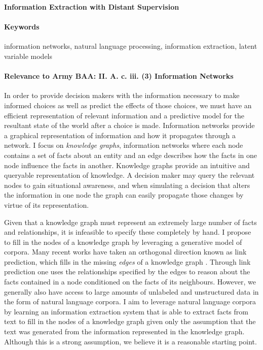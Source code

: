 \documentclass[12pt]{article}
\begin{document}

\begin{center}
\textbf{Information Extraction with Distant Supervision}
\end{center}

\paragraph{Keywords}
information networks, natural language processing, information extraction, latent variable models

\paragraph{Relevance to Army BAA: II. A. c. iii. (3) Information Networks}
In order to provide decision makers with the information
necessary to make informed choices as well as predict the effects of those choices,
we must have an efficient representation of relevant information and a predictive model
for the resultant state of the world after a choice is made.
Information networks provide a graphical representation of information and how it
propagates through a network.
I focus on \textit{knowledge graphs}, information networks where each node contains a set of facts
about an entity and an edge describes how the facts in one node influence the facts in another.
Knowledge graphs provide an intuitive and queryable representation of knowledge.
A decision maker may query the relevant nodes to gain situational awareness, and
when simulating a decision that alters the information in one node
the graph can easily propagate those changes by virtue of its representation.

Given that a knowledge graph must represent an extremely large number of facts and relationships,
it is infeasible to specify these completely by hand.
I propose to fill in the nodes of a knowledge graph by leveraging a generative model
of corpora.
Many recent works have taken an orthogonal direction known as link prediction,
which fills in the missing \textit{edges} of a knowledge graph \citep{chen2018diva}.
Through link prediction one uses the relationships
specified by the edges to reason about the facts contained in a node conditioned on
the facts of its neighbours.
However, we generally also have access to large amounts of unlabeled and unstructured data
in the form of natural language corpora.
I aim to leverage natural language corpora by
learning an information extraction system that is able to 
extract facts from text to fill in the nodes of a knowledge graph
given only the assumption that the text was generated from the information
represented in the knowledge graph.
Although this is a strong assumption, we believe it is a reasonable starting point.
\end{document}
